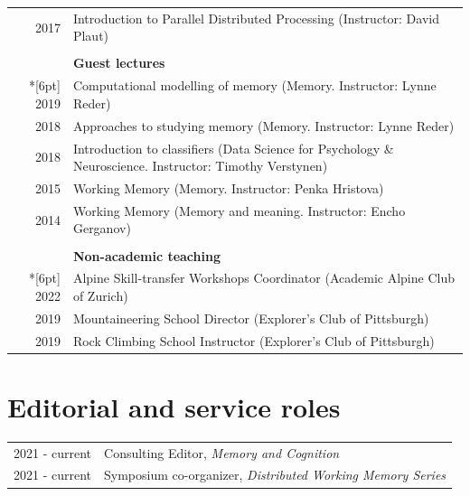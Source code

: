 \documentclass[letterpaper]{article}
\begin{document}
\begin{longtable}{rl}
       2017 & Introduction to Parallel Distributed Processing (Instructor:  David Plaut)                               \\
       &                                                                                                          \\
       & \textbf{Guest lectures}                                                                                  \\*[6pt]
       2019 & Computational modelling of memory (Memory. Instructor: Lynne Reder)                                      \\
       2018 & Approaches to studying memory (Memory. Instructor: Lynne Reder)                                          \\
       2018 & Introduction to classifiers (Data Science for Psychology \& Neuroscience. Instructor: Timothy Verstynen) \\
  2015 & Working Memory (Memory. Instructor: Penka Hristova)                                                      \\
  2014 & Working Memory (Memory and meaning. Instructor: Encho Gerganov)                                          \\
  &                                                                                                          \\
  & \textbf{Non-academic teaching}                                                                           \\*[6pt]
  2022 & Alpine Skill-transfer Workshops Coordinator (Academic Alpine Club of Zurich)                             \\
  2019 & Mountaineering School Director (Explorer's Club of Pittsburgh)                                           \\
  2019 & Rock Climbing School Instructor (Explorer's Club of Pittsburgh)                                          \\

\end{longtable}

\section*{Editorial and service roles}

\begin{tabular}{rl}
  2021 - current & Consulting Editor, {\it Memory and Cognition}                   \\
  2021 - current & Symposium co-organizer, {\it Distributed Working Memory Series}
\end{tabular}
\end{document}
